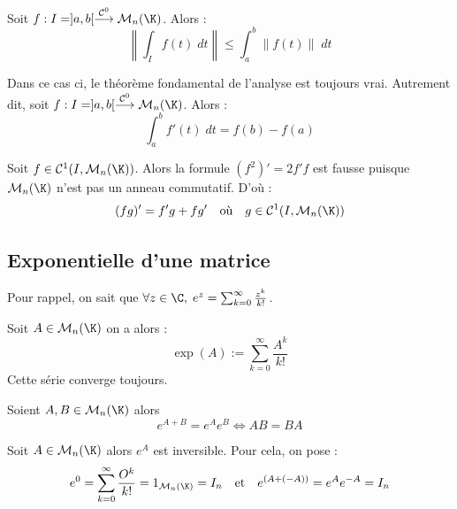 \begin{proposition}
    Soit $f : I = ]a,b[ \overset{ \mathcal{C}^0}{\longrightarrow} \mathcal{M}_n(\K)$. Alors :
        \[ \left\| \int_I f(t) \; dt \right\| \leqslant \int_{a}^{b} \left\| f(t) \right\| \; dt \] 
\end{proposition}

\begin{prop}
    Dans ce cas ci, le théorème fondamental de l'analyse est toujours vrai. 
    Autrement dit, soit $f : I = ]a,b[ \overset{ \mathcal{C}^0}{\longrightarrow} \mathcal{M}_n(\K)$. 
    Alors : 
        \[ \int_{a}^{b} f'(t) \; dt = f(b) - f(a) \] 
\end{prop}

\begin{remark}
    Soit $f \in \mathcal{C}^1(I, \mathcal{M}_n(\K))$. Alors la formule $(f^2)' = 2f'f$ est fausse 
    puisque $\mathcal{M}_n(\K)$ n'est pas un anneau commutatif. D'où : 
        \[ (fg)' = f'g + fg' \quad \text{où} \quad g \in \mathcal{C}^1(I, \mathcal{M}_n(\K)) \] 
\end{remark}

\subsection{Exponentielle d'une matrice}

\begin{remark}
    Pour rappel, on sait que $ \forall z \in \C, \; e^z = \sum_{k=0}^{\infty} \frac{z^k}{k!}$. 
\end{remark}

\begin{definition}
    Soit $A \in \mathcal{M}_n(\K)$ on a alors :
        \[ \exp(A) := \sum_{k=0}^{\infty} \frac{A^k}{k!} \]
    Cette série converge toujours. 
\end{definition}

\begin{proposition}
    Soient $A,B \in \mathcal{M}_n(\K)$ alors 
        \[ e^{A+B} = e^A e^B \iff AB = BA \] 
\end{proposition}

\begin{proposition}[Inverse]
    Soit $A \in \mathcal{M}_n(\K)$ alors $e^A$ est inversible. 
    Pour cela, on pose :
    \[ e^0 = \sum_{k=0}^{\infty} \frac{O^k}{k!} = 1_{\mathcal{M}_n(\K)} = I_n \quad \text{et} \quad e^{(A+ (-A))} = e^A e^{-A} = I_n \] 
\end{proposition}

